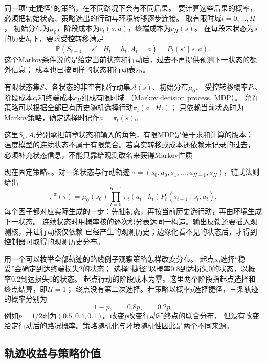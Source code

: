 同一项“走捷径”的策略，在不同路况下会有不同后果。
要计算这些后果的概率，必须把初始状态、策略选出的行动与环境转移逐步连接。
取有限时域$t=0,\ldots,H$，
初始分布为$\mu_0$，阶段成本为$c_t(s,a)$，终端成本为$c_H(s)$。
在每段末状态为$s$的历史$h_t$下，要求受控转移满足
\[
  \mathbb P(S_{t+1}=s'\mid H_t=h_t,A_t=a)=P_t(s'\mid s,a).
\]
这个Markov条件说的是给定当前状态和行动后，过去不再提供预测下一状态的额外信息；
成本也已按同样的状态和行动表示。

\begin{definition}[有限Markov决策过程与策略]
\label{def:decision-finite-mdp-policy}
有限状态集$\mathcal S$、各状态的非空有限行动集$\mathcal A(s)$、初始分布$\mu_0$、
受控转移概率$P_t$、阶段成本$c_t$和终端成本$c_H$组成有限时域
（Markov decision process, MDP）。
允许策略可以根据全部已有历史随机选择行动$\pi_t(a\mid H_t)$；
只依赖当前状态时为Markov策略，确定选择时记作$a=\pi_t(s)$。
\end{definition}

这里$S_t,A_t$分别承担前章状态和输入的角色，有限MDP是便于求和计算的版本；
温度模型的连续状态不属于有限集合。若真实转移或成本还依赖未记录的过去，
必须补充状态信息，不能只靠给观测改名来获得Markov性质

现在固定策略$\pi$。对一条状态与行动轨迹
$\tau=(s_0,a_0,s_1,\ldots,a_{H-1},s_H)$，链式法则给出
\begin{equation}
  \mathbb P^\pi(\tau)
  =\mu_0(s_0)\prod_{t=0}^{H-1}
    \pi_t(a_t\mid h_t)P_t(s_{t+1}\mid s_t,a_t).
  \label{eq:policy-trajectory-probability}
\end{equation}
每个因子都对应实际生成的一步：先抽初态，再按当前历史选行动，再由环境生成下一状态。
连续状态时用概率核的逐次积分表达同一构造。输出反馈还要插入观测核，并让行动核仅依赖
已经产生的观测历史；边缘化看不见的状态后，才得到控制器可取得的观测历史分布。

用一个可以枚举全部轨迹的路线例子观察策略怎样改变分布。
起点$s_0$选择“稳妥”会确定到达终端损失$2$的状态；
选择“捷径”以概率$0.8$到达损失$0$的状态，以概率$0.2$到达损失$6$的状态。
起点行动的阶段成本为零。这里两个阶段指起点选择和终点结算，即$H=1$；
终点没有第二次选择。若策略以概率$p$选择捷径，三条轨迹的概率分别为
\[
  1-p,\qquad 0.8p,\qquad 0.2p.
\]
例如$p=1/2$时为$(0.5,0.4,0.1)$。改变$p$改变行动和终点的联合分布，
但没有改变给定行动后的路况概率。策略随机化与环境随机性因此是两个不同来源。

\subsection{轨迹收益与策略价值}
\label{sec:policy-trajectory-return}

